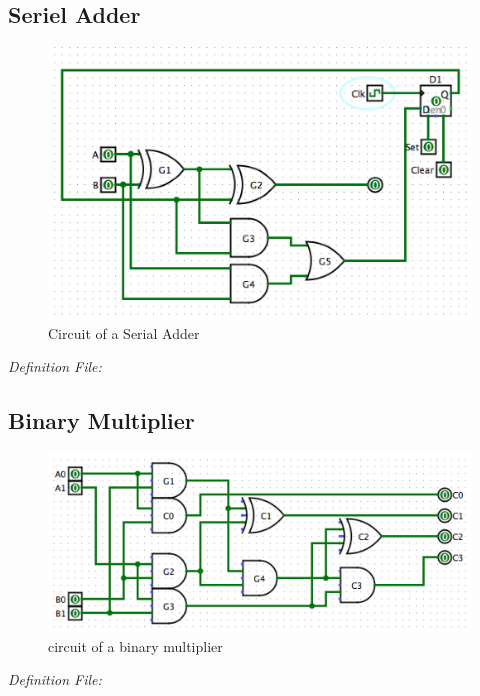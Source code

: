 \documentclass[12pt]{article}
\begin{document}
\subsection{Seriel Adder}
\begin{figure}[H]
    \centering
    \includegraphics[scale=0.55]{sequential_carry_adder.png}
    \caption{Circuit of a Serial Adder}
\end{figure}

\emph{Definition File:}



\subsection{Binary Multiplier}
\begin{figure}[H]
    \centering
    \includegraphics[scale=0.55]{bin_multiplier.png}
    \caption{circuit of a binary multiplier}
\end{figure}
\emph{Definition File:}

\end{document}
